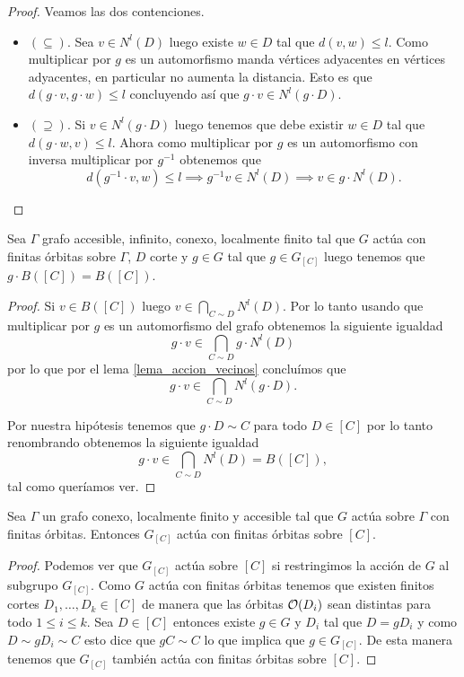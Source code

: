 \documentclass[tesis.tex]{subfiles}
\begin{document}
\begin{proof}
	Veamos las dos contenciones.
	
	\begin{itemize}
		\item $(\subseteq)$. 
		Sea $v \in N^l(D)$ luego existe $w \in D$ tal que $d(v,w) \le l$.
		Como multiplicar por $g$ es un automorfismo manda vértices adyacentes en vértices adyacentes, en particular no aumenta la distancia.
		Esto es que $d(g\cdot v,g\cdot w) \le l$ concluyendo así que $g \cdot v \in N^l(g \cdot D)$.  
		\item $(\supseteq)$.
		Si $v \in N^l(g\cdot D)$ luego tenemos que debe existir $w \in D$ tal que $d(g \cdot w, v) \le l$.
		Ahora como multiplicar por $g$ es un automorfismo con inversa multiplicar por $g^{-1}$ obtenemos que 
		\[
			d(g^{-1} \cdot v, w) \le l 
			\implies g^{-1}v \in N^l(D) \implies 
			 v \in g\cdot N^l(D).
		\]
	\end{itemize}
\end{proof}

\begin{lema}\label{lema_g_actua_b(C)}
	Sea $\Gamma$ grafo accesible, infinito, conexo, localmente finito tal que $G$ actúa con finitas órbitas sobre $\Gamma$, $D$ corte y $g \in G$ tal que $g \in G_{[C]}$ luego tenemos que 
	$g \cdot B([C]) = B([C])$.
\end{lema}
\begin{proof}
	Si $v \in B([C])$ luego $v \in \bigcap_{C \sim D} N^l(D)$.
	Por lo tanto usando que multiplicar por $g$ es un automorfismo del grafo obtenemos la siguiente igualdad
	\[
		g\cdot v \in \bigcap_{C \sim D} g \cdot N^l(D)
	\]
	por lo que por el lema \ref{lema_accion_vecinos} concluímos que 
	\[
		g\cdot v \in \bigcap_{C \sim D}   N^l(g\cdot D).
	\]	
	
	Por nuestra hipótesis tenemos que $g \cdot D \sim C$ para todo $D \in [C]$ por lo tanto renombrando obtenemos la siguiente igualdad
	\[
	g\cdot v \in \bigcap_{C \sim D}   N^l(D) = B([C]),
	\]
	tal como queríamos ver.
	
\end{proof}

\begin{lema}\label{lema_gC_actua_C}
	Sea $\Gamma$ un grafo conexo, localmente finito y accesible tal que $G$ actúa sobre $\Gamma$ con finitas órbitas.
	Entonces $G_{[C]}$ actúa con finitas órbitas sobre $[C]$.
\end{lema}
\begin{proof}
	Podemos ver que $G_{[C]}$ actúa sobre $[C]$ si restringimos la acción de $G$ al subgrupo $G_{[C]}$.
	Como $G$ actúa con finitas órbitas tenemos que existen finitos cortes $D_{1}, \dots, D_{k} \in [C]$ de manera que las órbitas ${\cal O}(D_{i})$ sean distintas para todo $1 \le i \le k$.
	Sea $D \in [C]$ entonces existe $g \in G$ y $D_{i}$ tal que $D = gD_{i}$ y como $D \sim gD_{i} \sim C$ esto dice que $gC \sim C$ lo que implica que 
	$g \in G_{[C]}$.
	De esta manera tenemos que $G_{[C]}$ también actúa con finitas órbitas sobre $[C]$. 
\end{proof}
\end{document}
